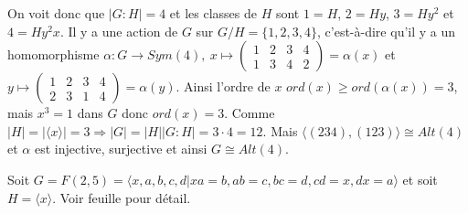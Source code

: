 \begin{ex}
       On voit donc que $|G:H| = 4$ et les classes de $H$ sont $1 = H$, $2 = Hy$, $3 = Hy^2$ et $4 =
       Hy^2x$. Il y a une action de $G$ sur $G/H = \{1,2,3,4\}$, c'est-à-dire qu'il y a un homomorphisme
       $\alpha : G \to Sym(4),\ x \mapsto
       \begin{pmatrix}
         1 & 2 & 3 & 4\\
         1 & 3 & 4 & 2
       \end{pmatrix} = \alpha(x)$ et $y \mapsto
       \begin{pmatrix}
         1 & 2 & 3 & 4 \\
         2 & 3 & 1 & 4
       \end{pmatrix} = \alpha(y)$. Ainsi l'ordre de $x$ $ord(x) \geq ord(\alpha(x)) = 3$, mais $x^3 = 1$ dans
       $G$ donc $ord(x) = 3$. Comme $|H| = |\langle x \rangle| = 3 \Rightarrow |G| = |H||G:H| = 3 \cdot 4 =
       12$. Mais $\langle (234), (123)\rangle \cong Alt(4)$ et $\alpha$ est injective, surjective et ainsi $G
       \cong Alt(4)$.
     \end{ex}


     \begin{ex}
       Soit $G = F(2,5) = \langle x, a, b, c, d | xa = b, ab = c, bc = d, cd = x, dx = a \rangle$ et soit $H =
       \langle x \rangle$. Voir feuille pour détail. 
     \end{ex}
     




     


